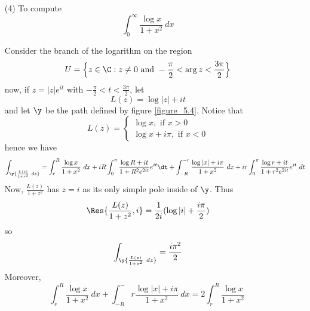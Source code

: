 \begin{example}
\begin{enumerate}
      \item[(4)] To compute
          \begin{equation*}
              \int_0^\infty{\frac{\log{x}}{1+x^2} \ dx}
          \end{equation*}

          Consider the branch of the logarithm on the region
          \begin{equation*}
              U=\Big{\{} z \in \C : z \neq 0 \text{ and }
              -\frac{\pi}{2}<\arg{z}<\frac{3\pi}{2} \Big{\}}
          \end{equation*}
          now, if $z=|z|e^{it}$ with $-\frac{\pi}{2}<t<\frac{3\pi}{2}$, let
          \begin{equation*}
              L(z)=\log{|z|}+it
          \end{equation*}
          and let $\y$ be the path defined by figure \ref{figure_5.4}. Notice
          that
          \begin{equation*}
              L(z)=\begin{cases}
                        \log{x}, \text{ if } x>0    \\
                        \log{x}+i\pi, \text{ if } x<0
                  \end{cases}
          \end{equation*}
          hence we have
          \begin{equation*}
              \int_\y{\frac{L(z)}{1+z^2} \ dz}=
              \int_r^R{\frac{\log{x}}{1+x^2} \ dx}+
              iR\int_0^\pi{\frac{\log{R}+it}{1+R^2e^{2it}}e^{it} \dt}+
              \int_{-R}^{-r}{\frac{\log{|x|+i\pi}}{1+x^2} \ dx}+
              ir\int_0^\pi{\frac{\log{r}+it}{1+r^2e^{2it}}e^{it} \ dt}
          \end{equation*}
          Now, $\frac{L(z)}{1+z^2}$ has $z=i$ as its only simple pole inside of
           $\y$. Thus
           \begin{equation*}
               \Res{\frac{L(z)}{1+z^2},i}=\frac{1}{2i}(\log{|i|+\frac{i\pi}{2}})
           \end{equation*}
           so
           \begin{equation*}
               \int_\y{\frac{L(z)}{1+z^2} \ dz}=\frac{i\pi^2}{2}
           \end{equation*}
           Moreover,
           \begin{equation*}
               \int_r^R{\frac{\log{x}}{1+x^2} \ dx}+
               \int_{-R}^-r{\frac{\log{|x|+i\pi}}{1+x^2} \ dx}=
               2\int_r^R{\frac{\log{x}}{1+x^2} \
}
\end{equation*}
\end{enumerate}
\end{example}
